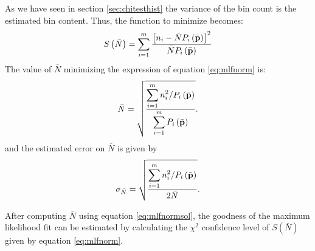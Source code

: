 As we have seen in section \ref{sec:chitesthist} the variance of
the bin count is the estimated bin content. Thus, the function to
minimize becomes:
\begin{equation}
\label{eq:mlfnorm}
S\left(\bar{N}\right)=\sum_{i=1}^m{\displaystyle\left[n_i-\bar{N}
P_i\left(\bar{\textbf p}\right)\right]^2
\over\displaystyle\bar{N}P_i\left(\bar{\textbf p}\right)}
\end{equation}
The value of $\bar{N}$ minimizing the expression of equation
\ref{eq:mlfnorm} is:
\begin{equation}
\label{eq:mlfnormsol}
\bar{N}=\sqrt{{\displaystyle\sum_{i=1}^m
n_i^2 / P_i\left(\bar{\textbf p}\right) \over\displaystyle\sum_{i=1}^m
P_i\left(\bar{\textbf p}\right)}}.
\end{equation}
and the estimated error on $\bar{N}$ is given by
\begin{equation}
\label{eq:mlfnormsigma}
\sigma_{\bar{N}}=\sqrt{{\displaystyle\sum_{i=1}^m n_i^2 /
P_i\left(\bar{\textbf p}\right) \over\displaystyle 2 \bar{N}}}.
\end{equation}

After computing $\bar{N}$ using equation \ref{eq:mlfnormsol}, the
goodness of the maximum likelihood fit can be estimated by
calculating the $\chi^2$ confidence level of
$S\left(\bar{N}\right)$ given by equation \ref{eq:mlfnorm}.

